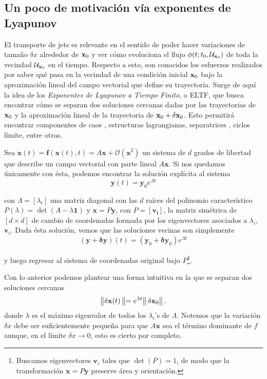 \subsection{Un poco de motivación vía exponentes de Lyapunov}

El transporte de jets es relevante en el sentido de poder hacer variaciones de tamaño $\delta x$ alrededor de $\mathbf{x}_0$ y ver cómo evoluciona el flujo $\phi(t;t_0,\mathcal{U}_{\mathbf{x}_0} )$ de toda la vecindad $\mathcal{U}_{\mathbf{x}_0}$ en el tiempo. Respecto a esto, son conocidos los esfuerzos realizados por saber qué pasa en la vecindad de una condición inicial $\mathbf{x}_0$ bajo la aproximación lineal del campo vectorial que define su trayectoria. Surge de aquí la idea de los \textit{Exponentes de Lyapunov a Tiempo Finito}, o ELTF, que busca encontrar cómo se separan dos soluciones cercanas dadas por las trayectorias de $\mathbf{x}_0$ y la aproximación lineal de la trayectoria de $\mathbf{x}_0 + \delta\mathbf{x}_0$. Esto permitirá encontrar componentes de caos \cite{Perez2015}, estructuras lagrangianas, separatrices \cite{Perez2015}, ciclos límite, entre otras. 

Sea $\dot{\mathbf{x}}(t) = \mathbf{f}(\mathbf{x}(t),t) = A\mathbf{x}+\mathcal{O}(\mathbf{x}^2)$ un sistema de $d$ grados de libertad que describe un campo vectorial con parte lineal $A \mathbf{x}$. Si nos quedamos únicamente con ésta, podemos encontrar la solución explícita al sistema
\begin{equation*}
 \mathbf{y}(t) = \mathbf{y}_0 e^{\Lambda t}
\end{equation*}

con $\Lambda = [\lambda_i]$ una matriz diagonal con las $d$ raíces del polinomio característico $P(\lambda) = \det(A - \lambda \mathbf{1})$ y $\mathbf{x} = P \mathbf{y}$, con $P = [\mathbf{v_i}]$, la matriz simétrica de $[d \times d]$ de cambio de coordenadas formada por los eigenvectores asociados a $\lambda_i$, $\mathbf{v}_i$.
Dada ésta solución, vemos que las soluciones vecinas son simplemente 
\begin{equation*}
 (\mathbf{y} + \mathbf{\delta y})(t) = (\mathbf{y}_0 + \mathbf{\delta y}_0) e^{\Lambda t}
\end{equation*}

y luego regresar al sistema de coordenadas original bajo $P$\footnote{Buscamos eigenvectores $\mathbf{v}_i$ tales que $\det(P) = 1$, de modo que la transformación $\mathbf{x} = P \mathbf{y}$ preserve área y orientación.}. 

Con lo anterior podemos plantear una forma intuitiva en la que se separan dos soluciones cercanas
\begin{equation}
 \left\lVert \mathbf{\delta x}(t) \left\lVert = e^{\lambda t} \right\rVert \mathbf{\delta x}_0 \right\rVert.
 \label{eq:lyap-sep}
\end{equation}
donde $\lambda$ es el máximo eigenvalor de todos los $\lambda_i$'s de $\Lambda$. Notemos que la variación $\delta x$ debe ser suficientemente pequeña para que $A\mathbf{x}$ sea el término dominante de $f$ aunque, en el límite $\delta x \to 0$, esto es cierto por completo. 

